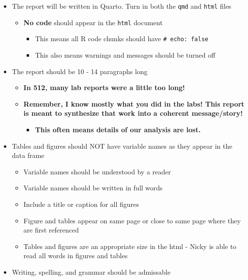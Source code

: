 \documentclass[
  letterpaper,
  DIV=11,
  numbers=noendperiod]{scrartcl}
\providecommand{\tightlist}{%
  \setlength{\itemsep}{0pt}\setlength{\parskip}{0pt}}\usepackage{longtable,booktabs,array}
\begin{document}
\begin{itemize}
\tightlist
\item
  The report will be written in Quarto. Turn in both the \texttt{qmd}
  and \texttt{html} files

  \begin{itemize}
  \tightlist
  \item
    \textbf{No code} should appear in the \texttt{html} document

    \begin{itemize}
    \tightlist
    \item
      This means all R code chunks should have
      \texttt{\#\textbar{}\ echo:\ false}
    \item
      This also means warnings and messages should be turned off
    \end{itemize}
  \end{itemize}
\item
  The report should be 10 - 14 paragraphs long

  \begin{itemize}
  \tightlist
  \item
    \textbf{In 512, many lab reports were a little too long!}
  \item
    \textbf{Remember, I know mostly what you did in the labs! This
    report is meant to synthesize that work into a coherent
    message/story!}

    \begin{itemize}
    \tightlist
    \item
      \textbf{This often means details of our analysis are lost.}
    \end{itemize}
  \end{itemize}
\item
  Tables and figures should NOT have variable names as they appear in
  the data frame

  \begin{itemize}
  \tightlist
  \item
    Variable names should be understood by a reader
  \item
    Variable names should be written in full words
  \item
    Include a title or caption for all figures
  \item
    Figure and tables appear on same page or close to same page where
    they are first referenced
  \item
    Tables and figures are an appropriate size in the html - Nicky is
    able to read all words in figures and tables
  \end{itemize}
\item
  Writing, spelling, and grammar should be admissable


\end{itemize}
\end{document}
